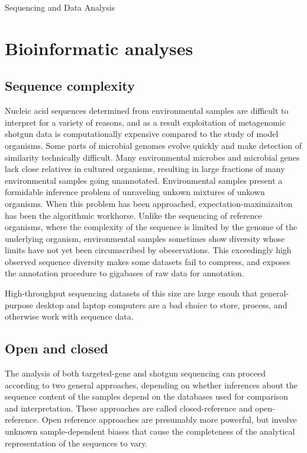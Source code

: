 \documentclass[graybox]{svmult}
\begin{document}
Sequencing and Data Analysis


\section{Bioinformatic analyses}
\label{sec:4}

\subsection{Sequence complexity}
Nucleic acid sequences determined from environmental samples are difficult to interpret for a variety of reasons, and as a result exploitation of metagenomic shotgun data is computationally expensive compared to the study of model organisms.
Some parts of microbial genomes evolve quickly and make detection of similarity technically difficult.
Many environmental microbes and microbial genes lack close relatives in cultured organisms, resulting in large fractions of many environmental samples going unannotated.
Environmental samples present a formidable inference problem of unraveling unkown mixtures of unkown organisms.  When this problem has been approached, expectation-maximizaiton has been the algorithmic workhorse.
Unlike the sequencing of reference organisms, where the complexity of the sequence is limited by the genome of the underlying organism, environmental samples sometimes show diversity whose limits have not yet been circumscribed by obeservations.  This exceedingly high observed sequence diversity makes some datasets fail to compress, and exposes the annotation procedure to gigabases of raw data for annotation.

High-throughput sequencing datasets of this size are large enouh that general-purpose desktop and laptop computers are a bad choice to store, process, and otherwise work with sequence data. 

\subsection{Open and closed}
The analysis of both targeted-gene and shotgun sequencing can proceed according to two general approaches, depending on whether inferences about the sequence content of the samples depend on the databases used for comparison and interpretation.  These approaches are called closed-reference and open-reference.  Open reference approaches are presumably more powerful, but involve unknown sample-dependent biases that cause the completeness of the analytical representation of the sequences to vary.
\end{document}
